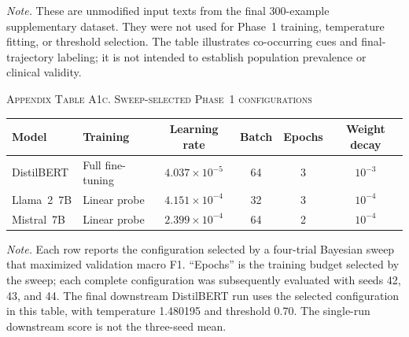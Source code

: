 \documentclass{ieeeaccess}
\begin{document}
\noindent\footnotesize\textit{Note.} These are unmodified input texts from the final 300-example supplementary dataset. They were not used for Phase~1 training, temperature fitting, or threshold selection. The table illustrates co-occurring cues and final-trajectory labeling; it is not intended to establish population prevalence or clinical validity.\normalsize
\par\medskip

\noindent\textsc{Appendix Table A1c. Sweep-selected Phase~1 configurations}\par
\label{tab:appendix-a1c-phase1-configurations}
\smallskip
\footnotesize
\setlength{\tabcolsep}{5pt}
\renewcommand{\arraystretch}{1.14}
\noindent\begin{tabularx}{\textwidth}{@{}>{\raggedright\arraybackslash}p{}>{\raggedright\arraybackslash}Y c c c c@{}}
\toprule
Model & Training & Learning rate & Batch & Epochs & Weight decay \\
\midrule
DistilBERT & Full fine-tuning & $4.037\times10^{-5}$ & 64 & 3 & $10^{-3}$ \\
Llama~2~7B & Linear probe & $4.151\times10^{-4}$ & 32 & 3 & $10^{-4}$ \\
Mistral~7B & Linear probe & $2.399\times10^{-4}$ & 64 & 2 & $10^{-4}$ \\
\bottomrule
\end{tabularx}
\par\smallskip
\normalsize

\noindent\footnotesize\textit{Note.} Each row reports the configuration selected by a four-trial Bayesian sweep that maximized validation macro F1. ``Epochs'' is the training budget selected by the sweep; each complete configuration was subsequently evaluated with seeds 42, 43, and 44. The final downstream DistilBERT run uses the selected configuration in this table, with temperature 1.480195 and threshold 0.70. The single-run downstream score is not the three-seed mean.\normalsize
\par\medskip
\end{document}
